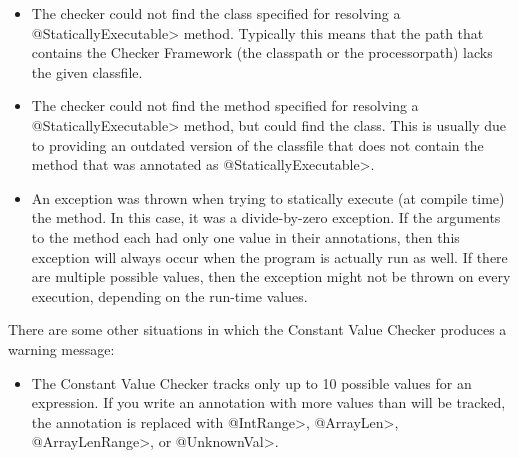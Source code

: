 \begin{sloppypar}
\begin{itemize}
\item {}

  The checker could not find the class
  specified for resolving a \<@StaticallyExecutable> method. Typically
  this means that the path that contains the Checker Framework (the
  classpath or the processorpath) lacks the given classfile.

\item {}

  The checker could not find the method  specified for
  resolving a \<@StaticallyExecutable> method, but could find the
  class. This is usually due to providing an outdated version of the
  classfile that does not contain the
  method that was annotated as \<@StaticallyExecutable>.

\item {}

  An exception was thrown when trying to statically execute (at compile time) the
  method. In this case, it was a divide-by-zero exception. If the
  arguments to the method each had only one value in their annotations,
  then this exception will always occur when the program is actually
  run as well. If there are multiple possible values, then the exception
  might not be thrown on every execution, depending on the run-time values.

\end{itemize}
\end{sloppypar}

There are some other situations in which the Constant Value Checker produces a
warning message:

\begin{sloppypar}
\begin{itemize}
\item {}

  The Constant Value Checker tracks only up to 10 possible values for an
  expression.  If you write an annotation with more values than will be
  tracked, the annotation is replaced with \<@IntRange>, \<@ArrayLen>, \<@ArrayLenRange>, or \<@UnknownVal>.

\end{itemize}
\end{sloppypar}


